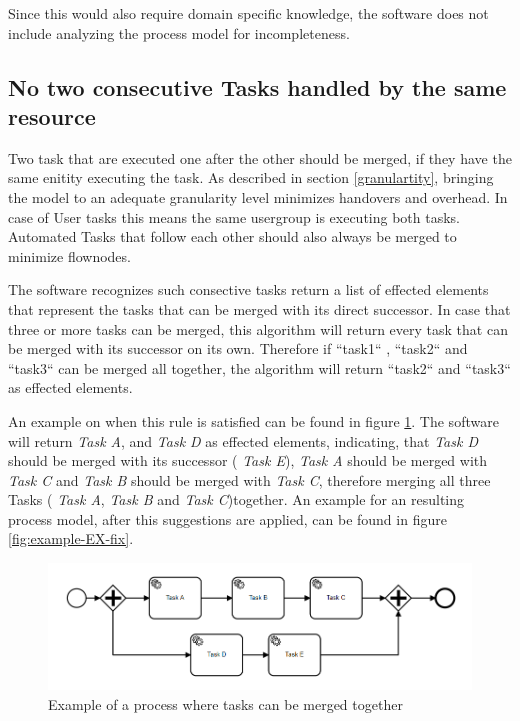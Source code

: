 Since this would also require domain specific knowledge, the software does not include analyzing the process model for incompleteness.

\subsection{No two consecutive Tasks handled by the same resource}
Two task that are executed one after the other should be merged, if they have the same enitity executing the task. As described in section \ref{granulartity}, bringing the model to an adequate granularity level minimizes handovers and overhead. In case of User tasks this means the same usergroup is executing both tasks. Automated Tasks that follow each other should also always be merged to minimize flownodes.


The software recognizes such consective tasks return a list of effected elements that represent the tasks that can be merged with its direct successor. In case that three or more tasks can be merged, this algorithm will return every task that can be merged with its successor on its own. Therefore if ``task1`` , ``task2`` and ``task3`` can be merged all together, the algorithm will return ``task2`` and ``task3`` as effected elements.

An example on when this rule is satisfied can be found in figure \ref{fig:example-EX}. The software will return \textit{Task A},  and \textit{Task D} as effected elements, indicating, that  \textit{Task D} should be merged with its successor ( \textit{Task E}),  \textit{Task A} should be merged with  \textit{Task C} and  \textit{Task B} should be merged with  \textit{Task C}, therefore merging all three Tasks ( \textit{Task A}, \textit{Task B} and  \textit{Task C})together. An example for an resulting process model, after this suggestions are applied, can be found in figure \ref{fig:example-EX-fix}.

\begin{figure}[H]
	\centering
	\includegraphics[width=0.9\columnwidth]{graphics/merge-suggestion-1}
	\caption{Example of a process where tasks can be merged together} 
	\label{fig:example-EX} 
\end{figure}

